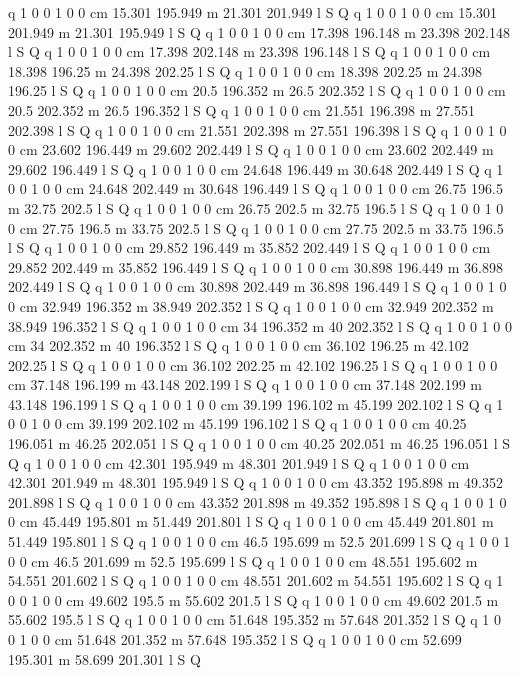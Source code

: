 q 1 0 0 1 0 0 cm
15.301 195.949 m 21.301 201.949 l S Q
q 1 0 0 1 0 0 cm
15.301 201.949 m 21.301 195.949 l S Q
q 1 0 0 1 0 0 cm
17.398 196.148 m 23.398 202.148 l S Q
q 1 0 0 1 0 0 cm
17.398 202.148 m 23.398 196.148 l S Q
q 1 0 0 1 0 0 cm
18.398 196.25 m 24.398 202.25 l S Q
q 1 0 0 1 0 0 cm
18.398 202.25 m 24.398 196.25 l S Q
q 1 0 0 1 0 0 cm
20.5 196.352 m 26.5 202.352 l S Q
q 1 0 0 1 0 0 cm
20.5 202.352 m 26.5 196.352 l S Q
q 1 0 0 1 0 0 cm
21.551 196.398 m 27.551 202.398 l S Q
q 1 0 0 1 0 0 cm
21.551 202.398 m 27.551 196.398 l S Q
q 1 0 0 1 0 0 cm
23.602 196.449 m 29.602 202.449 l S Q
q 1 0 0 1 0 0 cm
23.602 202.449 m 29.602 196.449 l S Q
q 1 0 0 1 0 0 cm
24.648 196.449 m 30.648 202.449 l S Q
q 1 0 0 1 0 0 cm
24.648 202.449 m 30.648 196.449 l S Q
q 1 0 0 1 0 0 cm
26.75 196.5 m 32.75 202.5 l S Q
q 1 0 0 1 0 0 cm
26.75 202.5 m 32.75 196.5 l S Q
q 1 0 0 1 0 0 cm
27.75 196.5 m 33.75 202.5 l S Q
q 1 0 0 1 0 0 cm
27.75 202.5 m 33.75 196.5 l S Q
q 1 0 0 1 0 0 cm
29.852 196.449 m 35.852 202.449 l S Q
q 1 0 0 1 0 0 cm
29.852 202.449 m 35.852 196.449 l S Q
q 1 0 0 1 0 0 cm
30.898 196.449 m 36.898 202.449 l S Q
q 1 0 0 1 0 0 cm
30.898 202.449 m 36.898 196.449 l S Q
q 1 0 0 1 0 0 cm
32.949 196.352 m 38.949 202.352 l S Q
q 1 0 0 1 0 0 cm
32.949 202.352 m 38.949 196.352 l S Q
q 1 0 0 1 0 0 cm
34 196.352 m 40 202.352 l S Q
q 1 0 0 1 0 0 cm
34 202.352 m 40 196.352 l S Q
q 1 0 0 1 0 0 cm
36.102 196.25 m 42.102 202.25 l S Q
q 1 0 0 1 0 0 cm
36.102 202.25 m 42.102 196.25 l S Q
q 1 0 0 1 0 0 cm
37.148 196.199 m 43.148 202.199 l S Q
q 1 0 0 1 0 0 cm
37.148 202.199 m 43.148 196.199 l S Q
q 1 0 0 1 0 0 cm
39.199 196.102 m 45.199 202.102 l S Q
q 1 0 0 1 0 0 cm
39.199 202.102 m 45.199 196.102 l S Q
q 1 0 0 1 0 0 cm
40.25 196.051 m 46.25 202.051 l S Q
q 1 0 0 1 0 0 cm
40.25 202.051 m 46.25 196.051 l S Q
q 1 0 0 1 0 0 cm
42.301 195.949 m 48.301 201.949 l S Q
q 1 0 0 1 0 0 cm
42.301 201.949 m 48.301 195.949 l S Q
q 1 0 0 1 0 0 cm
43.352 195.898 m 49.352 201.898 l S Q
q 1 0 0 1 0 0 cm
43.352 201.898 m 49.352 195.898 l S Q
q 1 0 0 1 0 0 cm
45.449 195.801 m 51.449 201.801 l S Q
q 1 0 0 1 0 0 cm
45.449 201.801 m 51.449 195.801 l S Q
q 1 0 0 1 0 0 cm
46.5 195.699 m 52.5 201.699 l S Q
q 1 0 0 1 0 0 cm
46.5 201.699 m 52.5 195.699 l S Q
q 1 0 0 1 0 0 cm
48.551 195.602 m 54.551 201.602 l S Q
q 1 0 0 1 0 0 cm
48.551 201.602 m 54.551 195.602 l S Q
q 1 0 0 1 0 0 cm
49.602 195.5 m 55.602 201.5 l S Q
q 1 0 0 1 0 0 cm
49.602 201.5 m 55.602 195.5 l S Q
q 1 0 0 1 0 0 cm
51.648 195.352 m 57.648 201.352 l S Q
q 1 0 0 1 0 0 cm
51.648 201.352 m 57.648 195.352 l S Q
q 1 0 0 1 0 0 cm
52.699 195.301 m 58.699 201.301 l S Q
